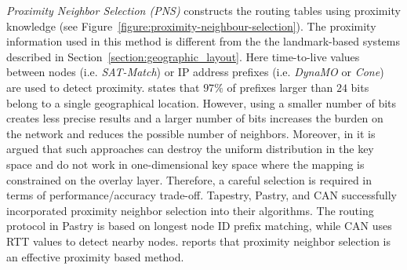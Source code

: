 \emph{Proximity Neighbor Selection (PNS)} constructs the routing tables using
proximity knowledge (see Figure~\ref{figure:proximity-neighbour-selection}). The
proximity information used in this method is different from the the
landmark-based systems described in Section~\ref{section:geographic_layout}.
Here time-to-live values between nodes (i.e. \emph{SAT-Match}) or IP address
prefixes (i.e. \emph{DynaMO} or \emph{Cone}) are used to detect
proximity. \cite{freedman_iploc_2005} states that $97\%$ of prefixes larger
than $24$ bits belong to a single geographical location. However, using a
smaller number of bits creates less precise results and a larger number of bits
increases the burden on the network and reduces the possible number of
neighbors. Moreover, in \cite{HLYW2005} it is argued that such approaches can
destroy the uniform distribution in the key space and do not work in
one-dimensional key space where the mapping is constrained on the overlay layer.
Therefore, a careful selection is required in terms of
performance/accuracy trade-off. Tapestry, Pastry, and CAN successfully incorporated
proximity neighbor selection into their algorithms. The routing protocol in
Pastry is based on longest node ID prefix matching, while CAN uses RTT values to
detect nearby nodes. \cite{CDCR2002a} reports that proximity neighbor
selection is an effective proximity based method.


%
%
%
%
%





